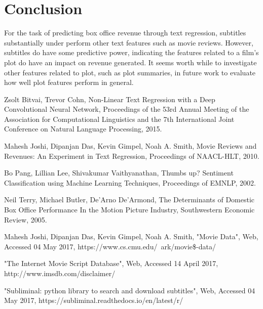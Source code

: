 \documentclass[11pt]{article}
\begin{document}
\section{Conclusion}
For the task of predicting box office revenue through text regression, subtitles
substantially under perform other text features such as movie reviews. However,
subtitles do have some predictive power, indicating the features related to a film's plot
do have an impact on revenue generated. It seems worth while to investigate other
features related to plot, such as plot summaries, in future work to evaluate how well
plot features perform in general.

\begin{thebibliography}{9}

  Zsolt Bitvai, Trevor Cohn,
  Non-Linear Text Regression with a Deep Convolutional Neural Network,
  Proceedings of the 53rd Annual Meeting of the Association for Computational
  Linguistics and the 7th International Joint Conference on Natural Language Processing,
  2015.
    
  Mahesh Joshi, Dipanjan Das, Kevin Gimpel, Noah A. Smith,
  Movie Reviews and Revenues: An Experiment in Text Regression,
  Proceedings of NAACL-HLT,
  2010.
  
  Bo Pang, Lillian Lee, Shivakumar Vaithyanathan,
  Thumbs up? Sentiment Classification using Machine Learning Techniques,
  Proceedings of EMNLP,
  2002.
  
  Neil Terry, Michael Butler, De'Arno De'Armond,
  The Determinants of Domestic Box Office Performance In the Motion Picture Industry,
  Southwestern Economic Review,
  2005.
    
  Mahesh Joshi, Dipanjan Das, Kevin Gimpel, Noah A. Smith,
  "Movie Data",
  Web,
  Accessed 04 May 2017,
  https://www.cs.cmu.edu/~ark/movie\$-data/

    "The Internet Movie Script Database",
    Web,
    Accessed 14 April 2017,
    http://www.imsdb.com/disclaimer/
    
    "Subliminal: python library to search and download subtitles",
    Web,
    Accessed 04 May 2017,
    https://subliminal.readthedocs.io/en/latest/r/
  
\end{thebibliography}
\end{document}
